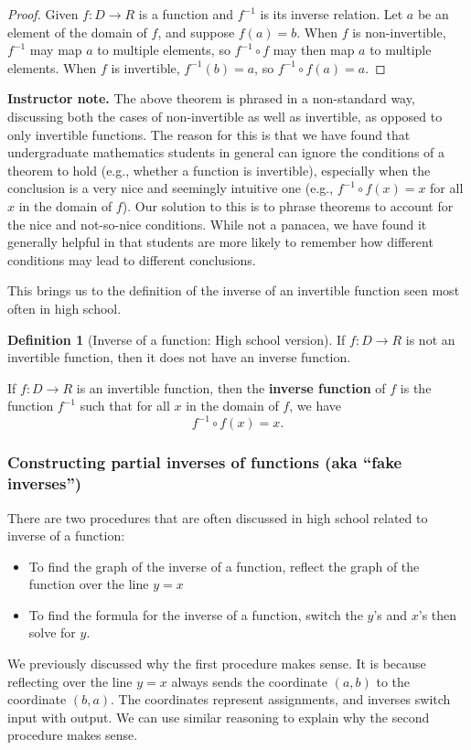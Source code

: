 \documentclass[11pt]{article}
\newcommand\smallnote[1]
	{\begin{mdframed}\raggedright  {\bf Instructor note.} {#1} \end{mdframed}}
\theoremstyle{definition}
\newtheorem{definition}[theorem]{Definition}
\begin{document}
\begin{proof}
Given $f:D\to R$ is a function and $f^{-1}$ is its inverse relation. Let $a$ be an element of the domain of $f$, and suppose $f(a)=b$. When $f$ is non-invertible, $f^{-1}$ may map $a$ to multiple elements, so $f^{-1}\circ f$ may then map $a$ to multiple elements. When $f$ is invertible, $f^{-1}(b)=a$, so $f^{-1}\circ f(a)=a$. 
\end{proof}

\smallnote{The above theorem is phrased in a non-standard way, discussing both the cases of non-invertible as well as invertible, as opposed to only invertible functions. The reason for this is that we have found that undergraduate mathematics students in general can ignore the conditions of a theorem to hold (e.g., whether a function is invertible), especially when the conclusion is a very nice and seemingly intuitive one (e.g., $f^{-1}\circ f(x)=x$ for all $x$ in the domain of $f$). Our solution to this is to phrase theorems to account for the nice and not-so-nice conditions. While not a panacea, we have found it generally helpful in that students are more likely to remember how different conditions may lead to different conclusions.}

This brings us to the definition of the inverse of an invertible function seen most often in high school.

\begin{definition}[Inverse of a function: High school version] \label{d: inverse of a function}
If $f:D\to R$ is not an invertible function, then it does not have an inverse function.

If $f:D\to R$ is an invertible function, then the {\bf inverse function} of $f$ is the function $f^{-1}$ such that for all $x$ in the domain of $f$, we have
	$$f^{-1}\circ f(x)=x.$$
\end{definition}

\subsubsection{Constructing partial inverses of functions (aka ``fake inverses'')}


There are two procedures that are often discussed in high school related to inverse of a function:
	\begin{itemize}
	\item To find the graph of the inverse of a function, reflect the graph of the function over the line $y=x$
	\item To find the formula for the inverse of a function, switch the $y$'s and $x$'s then solve for $y$.
	\end{itemize}
We previously discussed why the first procedure makes sense. It is because reflecting over the line $y=x$ always sends the coordinate $(a,b)$ to the coordinate $(b,a)$. The coordinates represent assignments, and inverses switch input with output. We can use similar reasoning to explain why the second procedure makes sense. 
\end{document}
